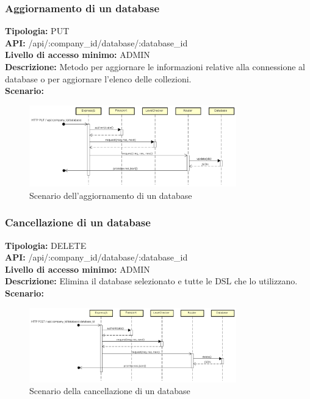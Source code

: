 \newpage
\subsubsection{Aggiornamento di un database}
\textbf{Tipologia:} PUT \\
\textbf{API:} /api/:company\_id/database/:database\_id \\
\textbf{Livello di accesso minimo:} ADMIN \\
\textbf{Descrizione:} Metodo per aggiornare le informazioni relative alla connessione al database o per aggiornare l'elenco delle collezioni. \\
\textbf{Scenario:}
\begin{figure}[h]
\centering
\includegraphics[width=0.8\textwidth]{res/sections/backend/(PUT)database.png}
\caption{Scenario dell'aggiornamento di un database}
\end{figure}

\newpage
\subsubsection{Cancellazione di un database}
\textbf{Tipologia:} DELETE \\
\textbf{API:} /api/:company\_id/database/:database\_id \\
\textbf{Livello di accesso minimo:} ADMIN \\
\textbf{Descrizione:} Elimina il database selezionato e tutte le DSL che lo utilizzano. \\
\textbf{Scenario:} 
\begin{figure}[h]
\centering
\includegraphics[width=0.8\textwidth]{res/sections/backend/(DELETE)database.png}
\caption{Scenario della cancellazione di un database}
\end{figure}

